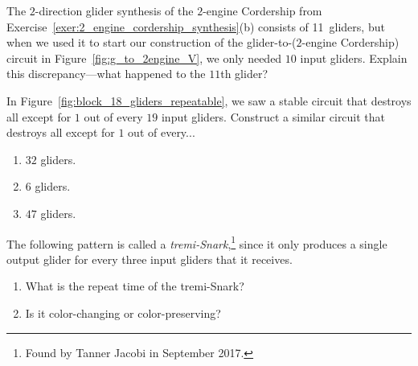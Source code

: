 \begin{multicols}{2}
	
	
	\mfilbreak
	
	
	\begin{problem}\label{fig:g_to_2engine_why_10_gliders}
		The $2$-direction glider synthesis of the $2$-engine Cordership from Exercise~\ref{exer:2_engine_cordership_synthesis}(b) consists of 11~gliders, but when we used it to start our construction of the glider-to-($2$-engine Cordership) circuit in Figure~\ref{fig:g_to_2engine_V}, we only needed $10$ input gliders. Explain this discrepancy---what happened to the $11$th glider?
	\end{problem}
	
	
	\mfilbreak
	
	
	\begin{problem}\label{exer:stable_thin_out_gliders}
		In Figure~\ref{fig:block_18_gliders_repeatable}, we saw a stable circuit that destroys all except for $1$ out of every $19$ input gliders. Construct a similar circuit that destroys all except for $1$ out of every...\smallskip
		
		\begin{enumerate}[label=\bf\color{ocre}(\alph*)]
			\item $32$ gliders.
			
			\item $6$ gliders.
			
			\item $47$ gliders.
		\end{enumerate}
	\end{problem}
	
	
	\mfilbreak
	
	
	\begin{problem}\label{exer:tremi_snark}
		The following pattern is called a \emph{tremi-Snark},\footnote{Found by Tanner Jacobi in September 2017.} since it only produces a single output glider for every three input gliders that it receives.
		
		\begin{center}
		\end{center}
		
		\begin{enumerate}[label=\bf\color{ocre}(\alph*)]
			\item What is the repeat time of the tremi-Snark?%
			
			\item Is it color-changing or color-preserving?%
			

\end{enumerate}
\end{problem}
\end{multicols}
